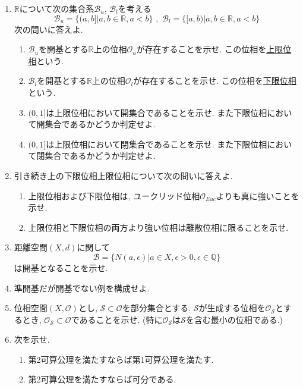 \documentclass[dvipdfmx,a4paper,11pt]{article}
\newcommand{\R}{\mathbb{R}}
\newcommand{\Q}{\mathbb{Q}}
\theoremstyle{definition}
\begin{document}
\begin{enumerate}[ label=\textbf{問}4.\arabic*]


\item $\R$について次の集合系$\mathscr{B}_u$, $\mathscr{B}_l$を考える
$$
\mathscr{B}_u = \{(a,b]| a,b \in \R, a<b\} \,\,,\,\,
\mathscr{B}_l = \{[a,b)| a,b \in \R, a<b\}
$$
次の問いに答えよ.
	\begin{enumerate}
	\item $\mathscr{B}_u $を開基とする$\R$上の位相$\mathscr{O}_u$が存在することを示せ. この位相を\underline{上限位相}という.
	\item $\mathscr{B}_l$を開基とする$\R$上の位相$\mathscr{O}_l$が存在することを示せ. この位相を\underline{下限位相}という.
	\item $(0,1]$は上限位相において開集合であることを示せ. また下限位相において開集合であるかどうか判定せよ.
	\item $(0,1]$は上限位相において閉集合であることを示せ. また下限位相において閉集合であるかどうか判定せよ.
	\end{enumerate}
\item 引き続き上の下限位相上限位相について次の問いに答えよ.
	\begin{enumerate}
	\item 上限位相および下限位相は, ユークリッド位相$\mathscr{O}_{Euc}$よりも真に強いことを示せ.
	\item 上限位相と下限位相の両方より強い位相は離散位相に限ることを示せ.
	\end{enumerate}

\item 距離空間$(X,d)$に関して
$$\mathscr{B} = \{ N(a,\epsilon) | a \in X, \epsilon >0, \epsilon \in \Q\}
$$
は開基となることを示せ.
\item 準開基だが開基でない例を構成せよ.
\item 位相空間$(X, \mathscr{O})$とし, $\mathscr{S} \subset \mathscr{O}$を部分集合とする.
$\mathscr{S}$が生成する位相を$\mathscr{O}_{\mathscr{S}}$とするとき, $\mathscr{O}_{\mathscr{S}} \subset \mathscr{O}$であることを示せ. (特に$\mathscr{O}_{\mathscr{S}}$は$\mathscr{S}$を含む最小の位相である.)


\item 次を示せ.
	\begin{enumerate}
	\item 第2可算公理を満たすならば第1可算公理を満たす.
	\item 第2可算公理を満たすならば可分である.
	\end{enumerate}


\end{enumerate}
\end{document}
